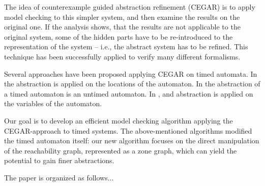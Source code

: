 The idea of counterexample guided abstraction refinement (CEGAR)  is to apply 
model checking to this simpler system, and then examine the results on the original one.
If the analysis shows, that the results are not applicable to the original system, some of the hidden parts have to be re-introduced to the representation of the system -- i.e.,
the abstract system has to be refined. This technique has been successfully applied to verify many different
formalisms.

Several approaches have been proposed applying CEGAR on timed automata.  In 
the abstraction is applied on the locations of the automaton. In
 the abstraction of a timed automaton is an untimed
automaton. In , and
 abstraction is applied on the variables of the automaton.

Our goal is to develop an efficient model checking algorithm applying the
CEGAR-approach to timed systems. The above-mentioned algorithms modified the timed automaton itself: our new 
algorithm focuses on the direct manipulation of the reachability graph, represented as a zone graph, which can
yield the potential to gain finer abstractions.

The paper is organized as follows... 


